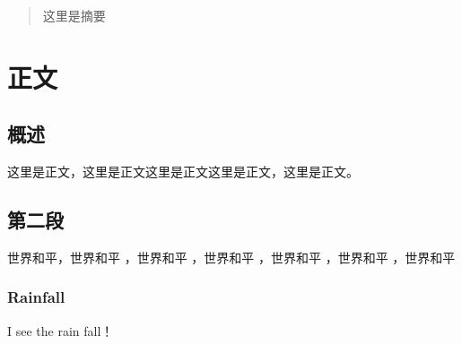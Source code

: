 \documentclass[12pt,hyperref,a4paper,UTF8]{ctexart}
\begin{document}
\cover
\thispagestyle{empty} %

\newpage

\begin{abstract}

这里是摘要

\end{abstract}

 




\setcounter{section}{1}
\section*{正文}
\renewcommand{\thesubsection}{\arabic{subsection}} 

\subsection{概述}

这里是正文，这里是正文这里是正文这里是正文，这里是正文。

\subsection{第二段}
世界和平，世界和平
，世界和平
，世界和平
，世界和平
，世界和平
，世界和平\cite{DigiScatter}
\subsubsection{Rainfall}
I see the rain fall！







\end{document}
